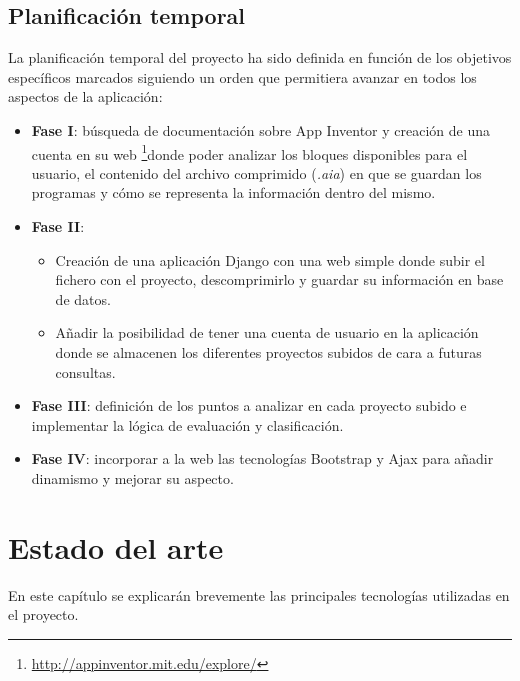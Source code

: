 \documentclass[a4paper, 12pt]{book}
\begin{document}
\section{Planificación temporal}
\label{sec:planificacion-temporal}
La planificación temporal del proyecto ha sido definida en función de los objetivos específicos marcados siguiendo un orden que permitiera avanzar en todos los aspectos de la aplicación:
\begin{itemize}
  \item \textbf{Fase I}: búsqueda de documentación sobre App Inventor y creación de una cuenta en su web \footnote{\url{http://appinventor.mit.edu/explore/}}donde poder analizar los bloques disponibles para el usuario, el contenido del archivo comprimido (\textit{.aia}) en que se guardan los programas y cómo se representa la información dentro del mismo. 

  \item \textbf{Fase II}: 
	\begin{itemize}
		\item Creación de una aplicación Django con una web simple donde subir el fichero con el proyecto, descomprimirlo y guardar su información en base de datos.
		\item Añadir la posibilidad de tener una cuenta de usuario en la aplicación donde se almacenen los diferentes proyectos subidos de cara a futuras consultas. 
	\end{itemize}
  \item \textbf{Fase III}: definición de los puntos a analizar en cada proyecto subido e implementar la lógica de evaluación y clasificación.
  
  
  \item \textbf{Fase IV}: incorporar a la web las tecnologías Bootstrap y Ajax para añadir dinamismo y mejorar su aspecto. 
\end{itemize}



\cleardoublepage
\chapter{Estado del arte}

En este capítulo se explicarán brevemente las principales tecnologías utilizadas en el proyecto.
\end{document}
